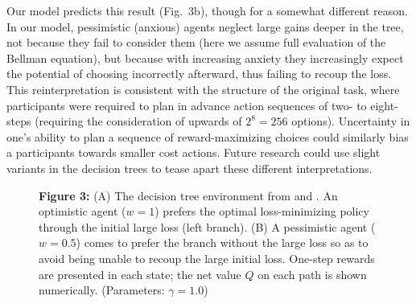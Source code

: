 \documentclass[11pt]{article} %
\begin{document}
Our model predicts this result (Fig.~3b), though for a somewhat different reason. In our model, pessimistic (anxious) agents neglect large gains deeper in the tree, not because they fail to consider them (here we assume full evaluation of the Bellman equation), but because with increasing anxiety they increasingly expect the potential of choosing incorrectly afterward, thus failing to recoup the loss. This reinterpretation is consistent with the structure of the original task\citep{Huys2012, Lally2017}, where participants were required to plan in advance action sequences of two- to eight-steps (requiring the consideration of upwards of $2^8 = 256$ options). Uncertainty in one's ability to plan a sequence of reward-maximizing choices could similarly bias a participants towards smaller cost actions. Future research could use slight variants in the decision trees to tease apart these different interpretations.


\begin{figure}[!b]
  \centerline{%
  }
  \par \textbf{Figure 3:} (A) The decision tree environment from \cite{Huys2012} and \cite{Lally2017}. An optimistic agent ($w=1$) prefers the optimal loss-minimizing policy through the initial large loss (left branch). (B) A pessimistic agent ($w=0.5$) comes to prefer the branch without the large loss so as to avoid being unable to recoup the large initial loss. One-step rewards are presented in each state; the net value $Q$ on each path is shown numerically. (Parameters: $\gamma = 1.0$)
\end{figure}
\end{document}
